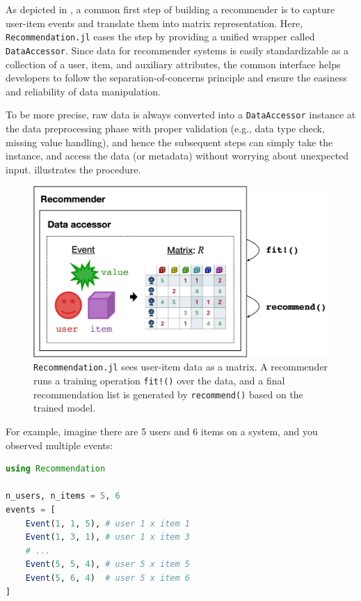 As depicted in , a common first step of building a recommender is to capture user-item events and translate them into matrix representation. Here, \texttt{Recommendation.jl} eases the step by providing a unified wrapper called \texttt{DataAccessor}. Since data for recommender systems is easily standardizable as a collection of a user, item, and auxiliary attributes, the common interface helps developers to follow the separation-of-concerns principle and ensure the easiness and reliability of data manipulation. 

To be more precise, raw data is always converted into a \texttt{DataAccessor} instance at the data preprocessing phase with proper validation (e.g., data type check, missing value handling), and hence the subsequent steps can simply take the instance, and access the data (or metadata) without worrying about unexpected input.  illustrates the procedure.

\begin{figure}[htbp]
    \centering
    \includegraphics[width=0.8\linewidth]{images/accessor.pdf}
    \caption{\texttt{Recommendation.jl} sees user-item data as a matrix. A recommender runs a training operation \texttt{fit!()} over the data, and a final recommendation list is generated by \texttt{recommend()} based on the trained model.}
    \label{fig:accessor}
\end{figure}

For example, imagine there are 5 users and 6 items on a system, and you observed multiple events:

\begin{lstlisting}[language = Julia]
using Recommendation

n_users, n_items = 5, 6
events = [
    Event(1, 1, 5), # user 1 x item 1
    Event(1, 3, 1), # user 1 x item 3
    # ...
    Event(5, 5, 4), # user 5 x item 5
    Event(5, 6, 4)  # user 5 x item 6
]
\end{lstlisting}

